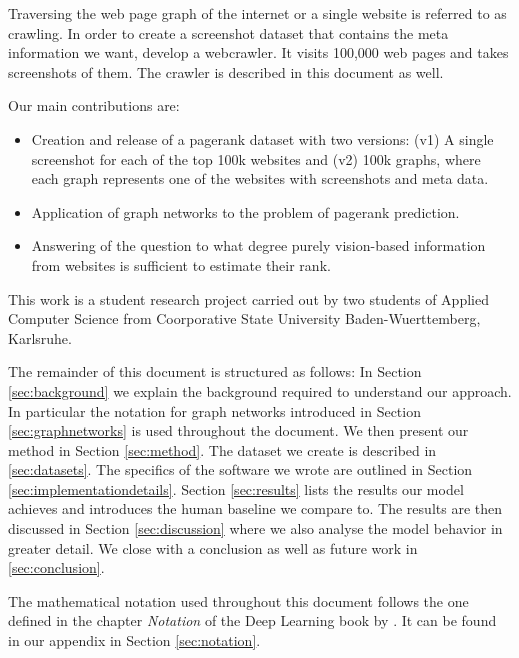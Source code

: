 Traversing the web page graph of the internet or a single website is referred to as crawling. In order to create a screenshot dataset that contains the meta information we want, develop a webcrawler. It visits 100,000 web pages and takes screenshots of them. The crawler is described in this document as well.

Our main contributions are:
\begin{itemize}
\item Creation and release of a pagerank dataset with two versions: (v1) A single screenshot for each of the top 100k websites and (v2) 100k graphs, where each graph represents one of the websites with screenshots and meta data.
\item Application of graph networks to the problem of pagerank prediction.
\item Answering of the question to what degree purely vision-based information from websites is sufficient to estimate their rank.
\end{itemize}

This work is a student research project carried out by two students of Applied Computer Science from Coorporative State University Baden-Wuerttemberg, Karlsruhe.

The remainder of this document is structured as follows: In Section \ref{sec:background} we explain the background required to understand our approach. In particular the notation for graph networks introduced in Section \ref{sec:graphnetworks} is used throughout the document. We then present our method in Section \ref{sec:method}. The dataset we create is described in \ref{sec:datasets}. The specifics of the software we wrote are outlined in Section \ref{sec:implementationdetails}. Section \ref{sec:results} lists the results our model achieves and introduces the human baseline we compare to. The results are then discussed in Section \ref{sec:discussion} where we also analyse the model behavior in greater detail. We close with a conclusion as well as future work in \ref{sec:conclusion}.

The mathematical notation used throughout this document follows the one defined in the chapter \textit{Notation} of the Deep Learning book by \cite{goodfellow:dlbook}. It can be found in our appendix in Section \ref{sec:notation}.
